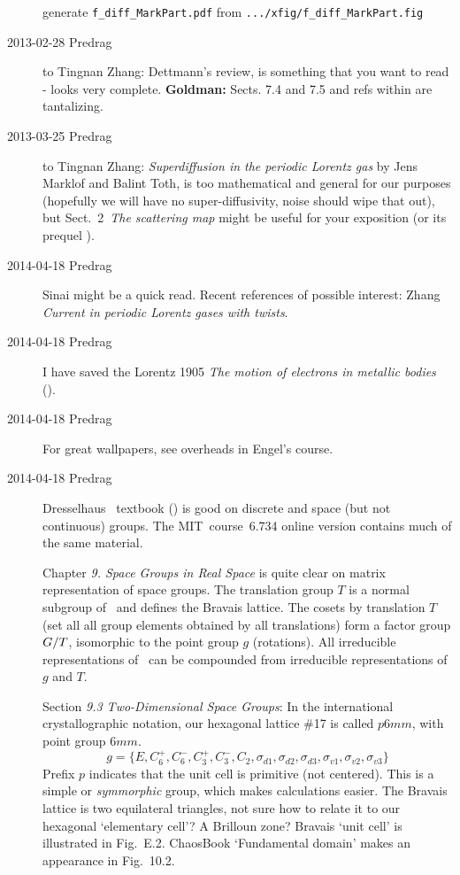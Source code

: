 \begin{description}
generate \texttt{f\_diff\_MarkPart.pdf}
from \texttt{.../xfig/f\_diff\_MarkPart.fig}

\item[2013-02-28 Predrag] to Tingnan Zhang:
Dettmann's review,  is something that you want to read -
looks very complete. {\bf Goldman:} Sects. 7.4 and 7.5 and refs within
are tantalizing.

\item[2013-03-25 Predrag] to Tingnan Zhang:
{\em Superdiffusion in the periodic Lorentz gas} by
Jens Marklof and Balint Toth,  	 is too mathematical and
general for our purposes (hopefully we will have no super-diffusivity, noise
should wipe that out), but
Sect.~2~{\em The scattering map} might be useful for your exposition
(or its prequel  ).

\item[2014-04-18 Predrag]
Sinai might be a quick read.
Recent references of possible interest:
Zhang
{\em Current in periodic {Lorentz} gases with twists}.

\item[2014-04-18 Predrag]
I have saved the Lorentz 1905
{\em The motion of electrons in metallic bodies}
().

\item[2014-04-18 Predrag]
For great wallpapers, see overheads in
{Engel's} course.

\item[2014-04-18 Predrag]
Dresselhaus \etal\ textbook
()
is good on discrete
and space (but not continuous) groups.
The MIT~course~6.734
{online version} contains much of the same material.

Chapter {\em 9. Space Groups in Real Space} is quite clear on matrix
representation of space groups. The translation group $T$ is a normal
subgroup of \Group\ and defines the Bravais lattice. The cosets by
translation $T$ (set all all group elements obtained by all translations)
form a factor group $G/T$, isomorphic to the point group $g$
(rotations). All irreducible representations of \Group\ can be compounded
from irreducible representations of $g$ and $T$.

Section {\em 9.3 Two-Dimensional Space Groups}: In the international
crystallographic notation, our hexagonal lattice \#17 is called $p6mm$,
with point group $6mm$.
\[
g = \{
E, C_6^+, C_6^-, C_3^+, C_3^-, C_2,
\sigma_{d1}, \sigma_{d2}, \sigma_{d3},
\sigma_{v1},\sigma_{v2}, \sigma_{v3}
\}
\]
Prefix $p$ indicates that the unit cell is primitive (not centered). This
is a simple or {\em symmorphic} group, which makes calculations easier.
The Bravais lattice is two equilateral triangles, not sure how to relate
it to our hexagonal `elementary cell'? A Brilloun zone? Bravais `unit cell'
is illustrated in Fig.~E.2. ChaosBook `Fundamental
domain' makes an appearance in Fig.~10.2.


\end{description}

